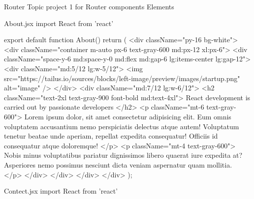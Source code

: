 Router Topic
  project 1 for Router
   components Elements
     
  About.jsx
                    import React from 'react'

                    export default function About() {
                        return (
                            <div className="py-16 bg-white">
                                <div className="container m-auto px-6 text-gray-600 md:px-12 xl:px-6">
                                    <div className="space-y-6 md:space-y-0 md:flex md:gap-6 lg:items-center lg:gap-12">
                                        <div className="md:5/12 lg:w-5/12">
                                            <img
                                                src="https://tailus.io/sources/blocks/left-image/preview/images/startup.png"
                                                alt="image"
                                            />
                                        </div>
                                        <div className="md:7/12 lg:w-6/12">
                                            <h2 className="text-2xl text-gray-900 font-bold md:text-4xl">
                                                React development is carried out by passionate developers
                                            </h2>
                                            <p className="mt-6 text-gray-600">
                                                Lorem ipsum dolor, sit amet consectetur adipisicing elit. Eum omnis voluptatem
                                                accusantium nemo perspiciatis delectus atque autem! Voluptatum tenetur beatae unde
                                                aperiam, repellat expedita consequatur! Officiis id consequatur atque doloremque!
                                            </p>
                                            <p className="mt-4 text-gray-600">
                                                Nobis minus voluptatibus pariatur dignissimos libero quaerat iure expedita at?
                                                Asperiores nemo possimus nesciunt dicta veniam aspernatur quam mollitia.
                                            </p>
                                        </div>
                                    </div>
                                </div>
                            </div>
                        );
                    }

                    Contect.jsx
                    import React from 'react'

